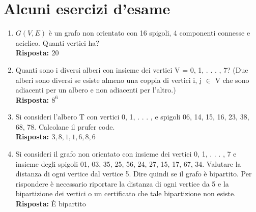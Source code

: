\documentclass[10pt,a4paper,titlepage]{article}
\theoremstyle{break}
\theoremstyle{break}
\theoremstyle{break}
\begin{document}
\newpage
\section{Alcuni esercizi d'esame}

\begin{enumerate}

\item $G(V,E)$ è un grafo non orientato con 16 spigoli, 4 componenti connesse e aciclico. Quanti vertici ha? \\
\textbf{Risposta: $20$}

\item Quanti sono i diversi alberi con insieme dei vertici V = {0, 1, . . . , 7}? (Due alberi sono diversi se esiste almeno una coppia di vertici i, j $\in$ V che sono adiacenti per un albero e non adiacenti per l'altro.) \\
\textbf{Risposta: $8^6$}

\item Si consideri l'albero T con vertici {0, 1, . . . , } e spigoli {06, 14, 15, 16, 23, 38, 68, 78}. Calcolane il prufer code. \\
\textbf{Risposta: $3, 8, 1, 1, 6, 8, 6$}

\item Si consideri il grafo non orientato con insieme dei vertici {0, 1, . . . , 7} e insieme degli spigoli {01, 03, 35, 25, 56, 24, 27, 15, 17, 67, 34}. Valutare la distanza di ogni vertice dal vertice 5. Dire quindi se il grafo è bipartito. Per rispondere è necessario riportare la distanza di ogni vertice da 5 e la bipartizione dei vertici o un certificato che tale bipartizione non esiste. \\
\textbf{Risposta:} È bipartito



\end{enumerate}
\end{document}
